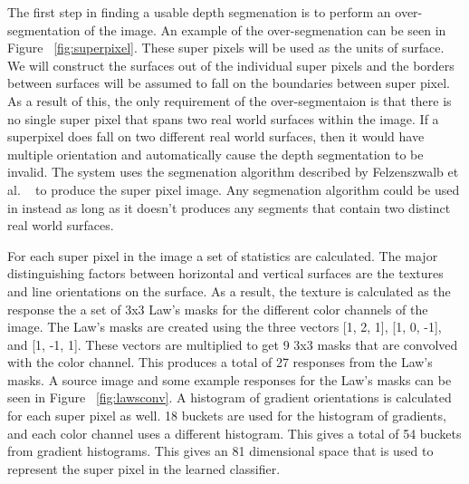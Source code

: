 \documentclass[times,10pt,twocolumn]{article}
\begin{document}
The first step in finding a usable depth segmenation is to perform an
over-segmentation of the image. An example of the over-segmenation can be seen
in Figure ~\ref{fig:superpixel}. These super pixels will be used as the units
of surface. We will construct the surfaces out of the individual super pixels
and the borders between surfaces will be assumed to fall on the boundaries
between super pixel. As a result of this, the only requirement of the
over-segmentaion is that there is no single super pixel that spans two real
world surfaces within the image. If a superpixel does fall on two different
real world surfaces, then it would have multiple orientation and automatically
cause the depth segmentation to be invalid. The system uses the segmenation
algorithm described by Felzenszwalb et al. ~\cite{Felzen} to produce the super
pixel image. Any segmenation algorithm could be used in instead as long as it
doesn't produces any segments that contain two distinct real world surfaces.

For each super pixel in the image a set of statistics are calculated. The major
distinguishing factors between horizontal and vertical surfaces are the
textures and line orientations on the surface. As a result, the texture is
calculated as the response the a set of 3x3 Law's masks for the different color
channels of the image. The Law's masks are created using the three vectors
[1, 2, 1], [1, 0, -1], and [1, -1, 1]. These vectors are multiplied to get
9 3x3 masks that are convolved with the color channel. This produces a total of
27 responses from the Law's masks. A source image and some example responses
for the Law's masks can be seen in Figure ~\ref{fig:lawsconv}. A histogram of
gradient orientations is calculated for each super pixel as well. 18 buckets
are used for the histogram of gradients, and each color channel uses a
different histogram. This gives a total of 54 buckets from gradient histograms.
This gives an 81 dimensional space that is used to represent the super pixel in
the learned classifier.

\end{document}
